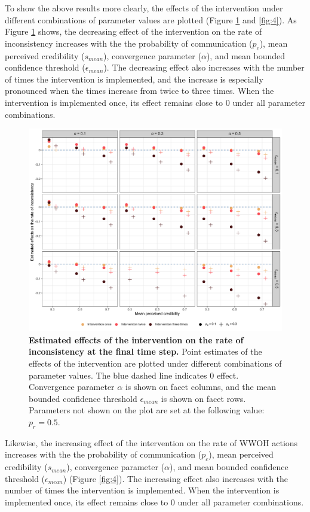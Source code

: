 \documentclass[
  11pt,
]{article}
\begin{document}
To show the above results more clearly, the effects of the intervention
under different combinations of parameter values are plotted (Figure
\ref{fig:3} and \ref{fig:4}). As Figure \ref{fig:3} shows, the
decreasing effect of the intervention on the rate of inconsistency
increases with the the probability of communication (\(p_c\)), mean
perceived credibility (\(s_{mean}\)), convergence parameter
(\(\alpha\)), and mean bounded confidence threshold
(\(\epsilon_{mean}\)). The decreasing effect also increases with the
number of times the intervention is implemented, and the increase is
especially pronounced when the times increase from twice to three times.
When the intervention is implemented once, its effect remains close to 0
under all parameter combinations.

\begin{figure}[h]
  \centering
  \includegraphics[width=1\columnwidth]{./figures/intervention_effect_p_inconsistency.png}
  \caption{\textbf{Estimated effects of the intervention on the rate of inconsistency at the final time step.} Point estimates of the effects of the intervention are plotted under different combinations of parameter values. The blue dashed line indicates 0 effect. Convergence parameter $\alpha$ is shown on facet columns, and the mean bounded confidence threshold $\epsilon_{mean}$ is shown on facet rows. Parameters not shown on the plot are set at the following value: $p_r = 0.5$.}
  \label{fig:3}
\end{figure}

Likewise, the increasing effect of the intervention on the rate of WWOH
actions increases with the the probability of communication (\(p_c\)),
mean perceived credibility (\(s_{mean}\)), convergence parameter
(\(\alpha\)), and mean bounded confidence threshold
(\(\epsilon_{mean}\)) (Figure \ref{fig:4}). The increasing effect also
increases with the number of times the intervention is implemented. When
the intervention is implemented once, its effect remains close to 0
under all parameter combinations.
\end{document}
